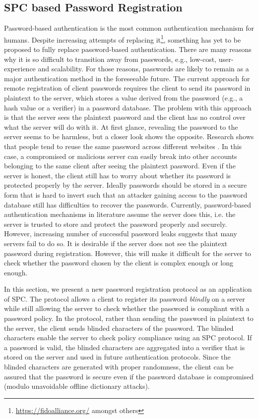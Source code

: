\subsection{SPC based Password Registration}\label{sec:protocol}

Password-based authentication is the most common authentication mechanism for humans. Despite increasing attempts of replacing it\footnote{\url{https://fidoalliance.org/} amongst others}, something has yet to be proposed to fully replace password-based authentication. 
There are many reasons why it is so difficult to transition away from passwords, e.g., low-cost, user-experience and scalability. For those reasons, passwords are likely to remain as a major authentication method in the foreseeable future. 
The current approach for remote registration of client passwords requires the client to send its password in plaintext to the server, which stores a value derived from the password (e.g., a hash value or a verifier) in a password database. 
The problem with this approach is that the server sees the plaintext password and the client has no control over what the server will do with it. 
At first glance, revealing the password to the server seems to be harmless, but a closer look shows the opposite. Research shows that people tend to reuse the same password across different websites \cite{FlorencioH07,GawF06,das14}. 
In this case, a compromised or malicious server can easily break into other accounts belonging to the same client after seeing the plaintext password. 
Even if the server is honest, the client still has to worry about whether its password is protected properly by the server. 
Ideally passwords should be stored in a secure form that is hard to invert such that an attacker gaining access to the password database still has difficulties to recover the passwords. 
Currently, password-based authentication mechanisms in literature assume the server does this, i.e. the server is trusted to store and protect the password properly and securely. 
However, increasing number of successful password leaks \cite{cupidBreach,rockyouBreach,adobeBreach} suggests that many servers fail to do so. It is desirable if the server does not see the plaintext password during registration. However, this will make it difficult for the server to check whether the password chosen by the client is complex enough or long enough.  

In this section, we present a new password registration protocol as an application of SPC. 
The protocol allows a client to register its password \emph{blindly} on a server while still allowing the server to check whether the password is compliant with a password policy. 
In the protocol, rather than sending the password in plaintext to the server, the client sends blinded characters of the password. 
The blinded characters enable the server to check policy compliance using an SPC protocol. 
If a password is valid, the blinded characters are aggregated into a verifier that is stored on the server and used in future authentication protocols. 
Since the blinded characters are generated with proper randomness, the client can be assured that the password is secure even if the password database is compromised (modulo unavoidable offline dictionary attacks).


